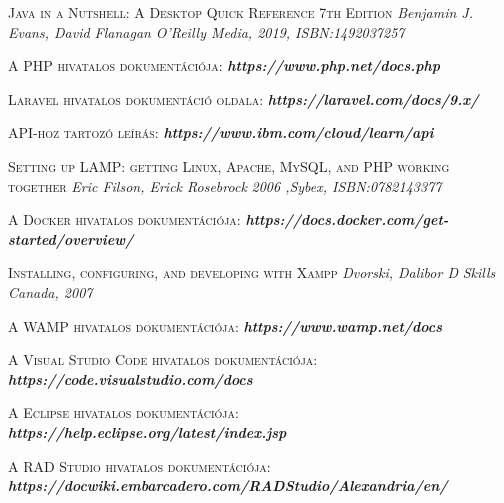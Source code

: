 \documentclass[
]{thesis-ekf}
\theoremstyle{definition}
\theoremstyle{remark}
\begin{document}
	
	\begin{thebibliography}{2}
		
		\textsc{Java in a Nutshell: A Desktop Quick Reference 7th Edition}
		\newline
		\emph{Benjamin J. Evans, David Flanagan}
		\emph{O'Reilly Media, 2019, ISBN:1492037257}
		
		\textsc{A PHP hivatalos dokumentációja:}
		\newline
		\emph{\bf{https://www.php.net/docs.php}}
		
		\textsc{Laravel hivatalos dokumentáció oldala:}
		\newline
		\emph{\bf{https://laravel.com/docs/9.x/}}
		
		\textsc{API-hoz tartozó leírás:}
		\newline
		\emph{\bf{https://www.ibm.com/cloud/learn/api}}
		
		\textsc{Setting up LAMP: getting Linux, Apache, MySQL, and PHP working together}
		\newline
		\emph{Eric Filson, Erick Rosebrock}
		\emph{2006 ,Sybex, ISBN:0782143377}
		
		\textsc{A Docker hivatalos dokumentációja:}
		\newline
		\emph{\bf{https://docs.docker.com/get-started/overview/}}
		
		\textsc{Installing, configuring, and developing with Xampp}
		\newline
		\emph{Dvorski, Dalibor D}
		\emph{Skills Canada, 2007}
		
		\textsc{A WAMP hivatalos dokumentációja:}
		\newline
		\emph{\bf{https://www.wamp.net/docs}}
		
		\textsc{A Visual Studio Code hivatalos dokumentációja:}
		\newline
		\emph{\bf{https://code.visualstudio.com/docs}}
		
		\textsc{A Eclipse hivatalos dokumentációja:}
		\newline
		\emph{\bf{https://help.eclipse.org/latest/index.jsp}}
		
		\textsc{A RAD Studio hivatalos dokumentációja:}
		\newline
		\emph{\bf{https://docwiki.embarcadero.com/RADStudio/Alexandria/en/}}
		

\end{thebibliography}
\end{document}
